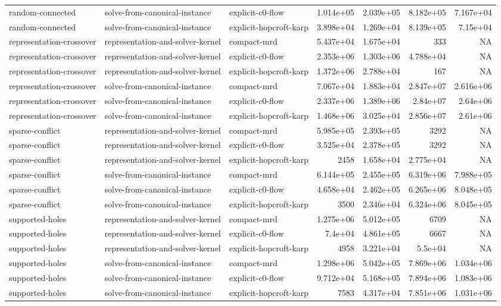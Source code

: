 \begin{table}[t]
\begin{tabular}{lllrrrr}
random-connected & solve-from-canonical-instance & explicit-c0-flow & 1.014e+05 & 2.039e+05 & 8.182e+05 & 7.167e+04 \\
random-connected & solve-from-canonical-instance & explicit-hopcroft-karp & 3.898e+04 & 1.269e+04 & 8.139e+05 & 7.15e+04 \\
representation-crossover & representation-and-solver-kernel & compact-mrd & 5.437e+04 & 1.675e+04 & 333 & NA \\
representation-crossover & representation-and-solver-kernel & explicit-c0-flow & 2.353e+06 & 1.303e+06 & 4.788e+04 & NA \\
representation-crossover & representation-and-solver-kernel & explicit-hopcroft-karp & 1.372e+06 & 2.788e+04 & 167 & NA \\
representation-crossover & solve-from-canonical-instance & compact-mrd & 7.067e+04 & 1.883e+04 & 2.847e+07 & 2.616e+06 \\
representation-crossover & solve-from-canonical-instance & explicit-c0-flow & 2.337e+06 & 1.389e+06 & 2.84e+07 & 2.64e+06 \\
representation-crossover & solve-from-canonical-instance & explicit-hopcroft-karp & 1.468e+06 & 3.025e+04 & 2.856e+07 & 2.61e+06 \\
sparse-conflict & representation-and-solver-kernel & compact-mrd & 5.985e+05 & 2.393e+05 & 3292 & NA \\
sparse-conflict & representation-and-solver-kernel & explicit-c0-flow & 3.525e+04 & 2.378e+05 & 3292 & NA \\
sparse-conflict & representation-and-solver-kernel & explicit-hopcroft-karp & 2458 & 1.658e+04 & 2.775e+04 & NA \\
sparse-conflict & solve-from-canonical-instance & compact-mrd & 6.144e+05 & 2.455e+05 & 6.319e+06 & 7.988e+05 \\
sparse-conflict & solve-from-canonical-instance & explicit-c0-flow & 4.658e+04 & 2.462e+05 & 6.265e+06 & 8.048e+05 \\
sparse-conflict & solve-from-canonical-instance & explicit-hopcroft-karp & 3500 & 2.346e+04 & 6.324e+06 & 8.045e+05 \\
supported-holes & representation-and-solver-kernel & compact-mrd & 1.275e+06 & 5.012e+05 & 6709 & NA \\
supported-holes & representation-and-solver-kernel & explicit-c0-flow & 7.4e+04 & 4.861e+05 & 6667 & NA \\
supported-holes & representation-and-solver-kernel & explicit-hopcroft-karp & 4958 & 3.221e+04 & 5.5e+04 & NA \\
supported-holes & solve-from-canonical-instance & compact-mrd & 1.298e+06 & 5.042e+05 & 7.869e+06 & 1.034e+06 \\
supported-holes & solve-from-canonical-instance & explicit-c0-flow & 9.712e+04 & 5.168e+05 & 7.894e+06 & 1.083e+06 \\
supported-holes & solve-from-canonical-instance & explicit-hopcroft-karp & 7583 & 4.317e+04 & 7.851e+06 & 1.031e+06 \\
\bottomrule
\end{tabular}
\end{table}

